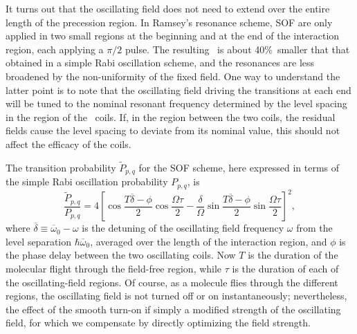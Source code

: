 It turns out that the oscillating field does not need to extend over the entire
length of the precession region. In Ramsey's resonance scheme, \gls{SOF} are
only applied in two small regions at the beginning and at the end of the
interaction region, each applying a $\pi/2$ pulse. The resulting \FWHM\ is about
40\%\ smaller that that obtained in a simple Rabi oscillation scheme, and the
resonances are less broadened by the non-uniformity of the fixed field.
\cite{PhysRev.78.695} One way to understand the latter point is to note that the
oscillating field driving the transitions at each end will be tuned to the
nominal resonant frequency determined by the level spacing in the region of the
\RF\ coils. If, in the region between the two coils, the residual fields cause
the level spacing to deviate from its nominal value, this should not affect the
efficacy of the coils.

The transition probability $\widetilde{P}_{p,q}$ for the \gls{SOF} scheme, here
expressed in terms of the simple Rabi oscillation probability $P_{p,q}$, is
\cite[cf.\ eqn~V.37]{ramsey1956molecular}
%
\[
    \frac{\widetilde{P}_{p,q}}
    {P_{p,q}}=4
    \left[
        \cos\frac{T\overline{\delta}-\phi}{2}\cos\frac{\Omega\tau}{2}
        -
        \frac{\delta}{\Omega}
        \sin\frac{T\overline{\delta}-\phi}{2}\sin\frac{\Omega\tau}{2}
    \right]^2
    ,
\]
%
where $\overline{\delta}\equiv\overline{\omega}_0-\omega$ is the detuning of the
oscillating field frequency $\omega$ from the level separation
$\hbar\overline{\omega}_0$, averaged over the length of the interaction region,
and $\phi$ is the phase delay between the two oscillating coils. Now $T$ is the
duration of the molecular flight through the field-free region, while $\tau$ is
the duration of each of the oscillating-field regions. Of course, as a molecule
flies through the different regions, the oscillating field is not turned off or
on instantaneously; nevertheless, the effect of the smooth turn-on if simply a
modified strength of the oscillating field, for which we compensate by directly
optimizing the field strength.

